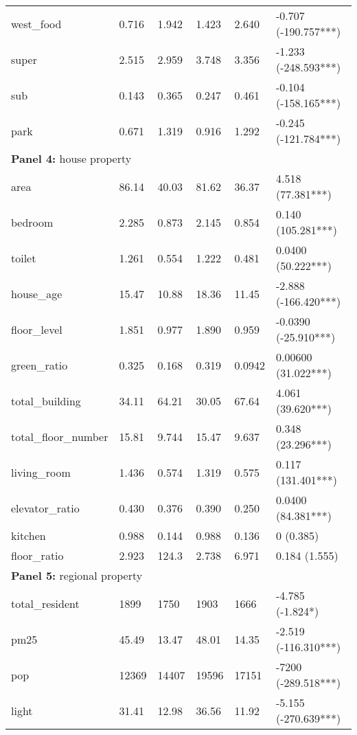 \begin{tabular}{llllll}
west\_food & 0.716 & 1.942 & 1.423 & 2.640 & -0.707 (-190.757***) \\
super & 2.515 & 2.959 & 3.748 & 3.356 & -1.233 (-248.593***) \\
sub & 0.143 & 0.365 & 0.247 & 0.461 & -0.104 (-158.165***) \\
park & 0.671 & 1.319 & 0.916 & 1.292 & -0.245 (-121.784***) \\
\multicolumn{6}{l}{\textbf{Panel 4: }house property} \\
area & 86.14 & 40.03 & 81.62 & 36.37 & 4.518 (77.381***) \\
bedroom & 2.285 & 0.873 & 2.145 & 0.854 & 0.140 (105.281***) \\
toilet & 1.261 & 0.554 & 1.222 & 0.481 & 0.0400 (50.222***) \\
house\_age & 15.47 & 10.88 & 18.36 & 11.45 & -2.888 (-166.420***) \\
floor\_level & 1.851 & 0.977 & 1.890 & 0.959 & -0.0390 (-25.910***) \\
green\_ratio & 0.325 & 0.168 & 0.319 & 0.0942 & 0.00600 (31.022***) \\
total\_building & 34.11 & 64.21 & 30.05 & 67.64 & 4.061 (39.620***) \\
total\_floor\_number & 15.81 & 9.744 & 15.47 & 9.637 & 0.348 (23.296***) \\
living\_room & 1.436 & 0.574 & 1.319 & 0.575 & 0.117 (131.401***) \\
elevator\_ratio & 0.430 & 0.376 & 0.390 & 0.250 & 0.0400 (84.381***) \\
kitchen & 0.988 & 0.144 & 0.988 & 0.136 & 0 (0.385) \\
floor\_ratio & 2.923 & 124.3 & 2.738 & 6.971 & 0.184 (1.555) \\
\multicolumn{6}{l}{\textbf{Panel 5: }regional property} \\
total\_resident & 1899 & 1750 & 1903 & 1666 & -4.785 (-1.824*) \\
pm25 & 45.49 & 13.47 & 48.01 & 14.35 & -2.519 (-116.310***) \\
pop & 12369 & 14407 & 19596 & 17151 & -7200 (-289.518***) \\
light & 31.41 & 12.98 & 36.56 & 11.92 & -5.155 (-270.639***) \\
\bottomrule
\end{tabular}
